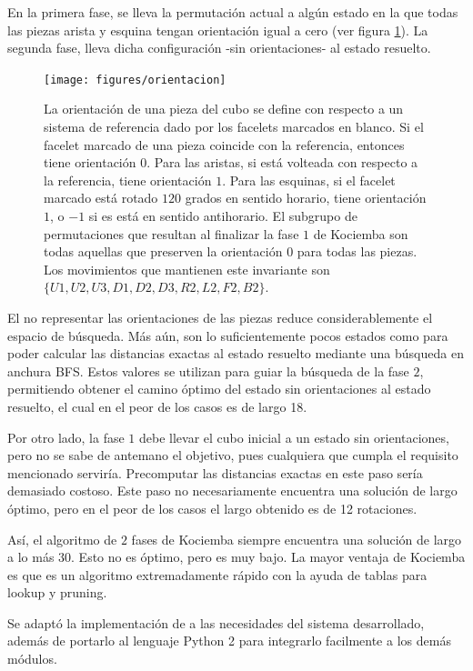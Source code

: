 En la primera fase, se lleva la permutación actual a algún estado en la que todas las piezas arista y esquina tengan orientación igual a cero (ver figura \ref{orientation}). La segunda fase, lleva dicha configuración -sin orientaciones- al estado resuelto.

\begin{figure}[h!]
	\centering
	\texttt{[image: figures/orientacion]}
	\caption[Definición de orientación.]{La orientación de una pieza del cubo se define con respecto a un sistema de referencia dado por los facelets marcados en blanco. Si el facelet marcado de una pieza coincide con la referencia, entonces tiene orientación $0$. Para las aristas, si está volteada con respecto a la referencia, tiene orientación $1$. Para las esquinas, si el facelet marcado está rotado $120$ grados en sentido horario, tiene orientación $1$, o $-1$ si es está en sentido antihorario. El subgrupo de permutaciones que resultan al finalizar la fase $1$ de Kociemba son todas aquellas que preserven la orientación $0$ para todas las piezas. Los movimientos que mantienen este invariante son $\{U1, U2, U3, D1, D2, D3, R2, L2, F2, B2\}$.}
	\label{orientation}
\end{figure}
El no representar las orientaciones de las piezas reduce considerablemente el espacio de búsqueda. Más aún, son lo suficientemente pocos estados como para poder calcular las distancias exactas al estado resuelto mediante una búsqueda en anchura BFS\cite{ida}. Estos valores se utilizan para guiar la búsqueda de la fase $2$, permitiendo obtener el camino óptimo del estado sin orientaciones al estado resuelto, el cual en el peor de los casos es de largo 18.

Por otro lado, la fase $1$ debe llevar el cubo inicial a un estado sin orientaciones, pero no se sabe de antemano el objetivo, pues cualquiera que cumpla el requisito mencionado serviría. Precomputar las distancias exactas en este paso sería demasiado costoso. Este paso no necesariamente encuentra una solución de largo óptimo, pero en el peor de los casos el largo obtenido es de 12 rotaciones.

Así, el algoritmo de $2$ fases de Kociemba siempre encuentra una solución de largo a lo más $30$. Esto no es óptimo, pero es muy bajo. La mayor ventaja de Kociemba es que es un algoritmo extremadamente rápido con la ayuda de tablas para lookup y pruning.

Se adaptó la implementación de \cite{cubeexplorer} a las necesidades del sistema desarrollado, además de portarlo al lenguaje Python 2 para integrarlo facilmente a los demás módulos.

